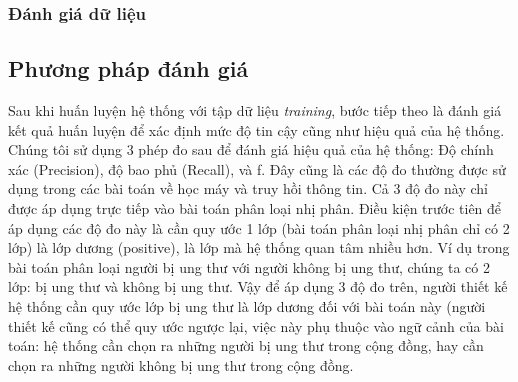 \subsubsection*{Đánh giá dữ liệu}

\subsection{Phương pháp đánh giá}
Sau khi huấn luyện hệ thống với tập dữ liệu \textit{training}, bước tiếp theo là đánh giá kết quả huấn luyện để xác định mức độ tin cậy cũng như hiệu quả của hệ thống. Chúng tôi sử dụng 3 phép đo sau để đánh giá hiệu quả của hệ thống: Độ chính xác (Precision), độ bao phủ (Recall), và f. Đây cũng là các độ đo thường được sử dụng trong các bài toán về học máy và truy hồi thông tin. Cả 3 độ đo này chỉ được áp dụng trực tiếp vào bài toán phân loại nhị phân. Điều kiện trước tiên để áp dụng các độ đo này là cần quy ước 1 lớp (bài toán phân loại nhị phân chỉ có 2 lớp) là lớp dương (positive), là lớp mà hệ thống quan tâm nhiều hơn. Ví dụ trong bài toán phân loại người bị ung thư với người không bị ung thư, chúng ta có 2 lớp: bị ung thư và không bị ung thư. Vậy để áp dụng 3 độ đo trên, người thiết kế hệ thống cần quy ước lớp bị ung thư là lớp dương đối với bài toán này (người thiết kế cũng có thể quy ước ngược lại, việc này phụ thuộc vào ngữ cảnh của bài toán: hệ thống cần chọn ra những người bị ung thư trong cộng đồng, hay cần chọn ra những người không bị ung thư trong cộng đồng.
